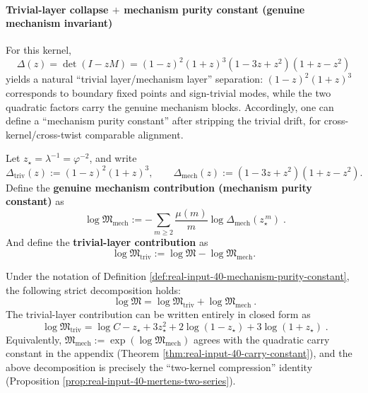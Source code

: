 \paragraph{Trivial-layer collapse \texorpdfstring{$+$}{+} mechanism purity constant (genuine mechanism invariant)}
For this kernel,
\[
\Delta(z)=\det(I-zM)=(1-z)^2(1+z)^3(1-3z+z^2)(1+z-z^2)
\]
yields a natural ``trivial layer/mechanism layer'' separation: \((1-z)^2(1+z)^3\) corresponds to boundary fixed points and sign-trivial modes, while the two quadratic factors carry the genuine mechanism blocks.
Accordingly, one can define a ``mechanism purity constant'' after stripping the trivial drift, for cross-kernel/cross-twist comparable alignment.

\begin{definition}\label{def:real-input-40-mechanism-purity-constant}
Let \(z_\star=\lambda^{-1}=\varphi^{-2}\), and write
\[
\Delta_{\mathrm{triv}}(z):=(1-z)^2(1+z)^3,\qquad
\Delta_{\mathrm{mech}}(z):=(1-3z+z^2)(1+z-z^2).
\]
Define the \textbf{genuine mechanism contribution (mechanism purity constant)} as
\[
\boxed{\;
\log\mathfrak{M}_{\mathrm{mech}}
:=
-\sum_{m\ge 2}\frac{\mu(m)}{m}\log \Delta_{\mathrm{mech}}(z_\star^{\,m})
\; }.
\]
And define the \textbf{trivial-layer contribution} as
\[
\boxed{\;
\log\mathfrak{M}_{\mathrm{triv}}
:=\log\mathfrak{M}-\log\mathfrak{M}_{\mathrm{mech}}.\;}
\]
\end{definition}

\begin{proposition}\label{prop:real-input-40-triv-mech-split}
Under the notation of Definition \ref{def:real-input-40-mechanism-purity-constant}, the following strict decomposition holds:
\[
\boxed{\ \log\mathfrak{M}=\log\mathfrak{M}_{\mathrm{triv}}+\log\mathfrak{M}_{\mathrm{mech}}\ }.
\]
The trivial-layer contribution can be written entirely in closed form as
\[
\boxed{\;
\log\mathfrak{M}_{\mathrm{triv}}
=\log C-z_\star+3z_\star^2+2\log(1-z_\star)+3\log(1+z_\star)\; }.
\]
Equivalently, \(\mathfrak{M}_{\mathrm{mech}}:=\exp(\log\mathfrak{M}_{\mathrm{mech}})\) agrees with the quadratic carry constant in the appendix (Theorem \ref{thm:real-input-40-carry-constant}), and the above decomposition is precisely the ``two-kernel compression'' identity (Proposition \ref{prop:real-input-40-mertens-two-series}).
\end{proposition}

